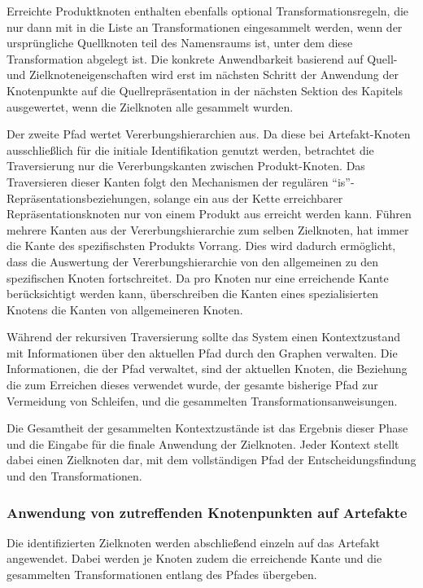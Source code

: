 Erreichte Produktknoten enthalten ebenfalls optional Transformationsregeln, die nur dann mit in die Liste an Transformationen eingesammelt werden, wenn der ursprüngliche Quellknoten teil des Namensraums ist, unter dem diese Transformation abgelegt ist.
Die konkrete Anwendbarkeit basierend auf Quell- und Zielknoteneigenschaften wird erst im nächsten Schritt der Anwendung der Knotenpunkte auf die Quellrepräsentation in der nächsten Sektion des Kapitels ausgewertet, wenn die Zielknoten alle gesammelt wurden.

Der zweite Pfad wertet Vererbungshierarchien aus.
Da diese bei Artefakt-Knoten ausschließlich für die initiale Identifikation genutzt werden, betrachtet die Traversierung nur die Vererbungskanten zwischen Produkt-Knoten.
Das Traversieren dieser Kanten folgt den Mechanismen der regulären \enquote{is}-Repräsentationsbeziehungen, solange ein aus der Kette erreichbarer Repräsentationsknoten nur von einem Produkt aus erreicht werden kann.
Führen mehrere Kanten aus der Vererbungshierarchie zum selben Zielknoten, hat immer die Kante des spezifischsten Produkts Vorrang.
Dies wird dadurch ermöglicht, dass die Auswertung der Vererbungshierarchie von den allgemeinen zu den spezifischen Knoten fortschreitet.
Da pro Knoten nur eine erreichende Kante berücksichtigt werden kann, überschreiben die Kanten eines spezialisierten Knotens die Kanten von allgemeineren Knoten.

Während der rekursiven Traversierung sollte das System einen Kontextzustand mit Informationen über den aktuellen Pfad durch den Graphen verwalten.
Die Informationen, die der Pfad verwaltet, sind der aktuellen Knoten, die Beziehung die zum Erreichen dieses verwendet wurde, der gesamte bisherige Pfad zur Vermeidung von Schleifen, und die gesammelten Transformationsanweisungen.

Die Gesamtheit der gesammelten Kontextzustände ist das Ergebnis dieser Phase und die Eingabe für die finale Anwendung der Zielknoten.
Jeder Kontext stellt dabei einen Zielknoten dar, mit dem vollständigen Pfad der Entscheidungsfindung und den Transformationen.

\subsubsection{Anwendung von zutreffenden Knotenpunkten auf Artefakte}\label{subsubsec:model-result-processing-apply-nodes-to-artifact}

Die identifizierten Zielknoten werden abschließend einzeln auf das Artefakt angewendet.
Dabei werden je Knoten zudem die erreichende Kante und die gesammelten Transformationen entlang des Pfades übergeben.

